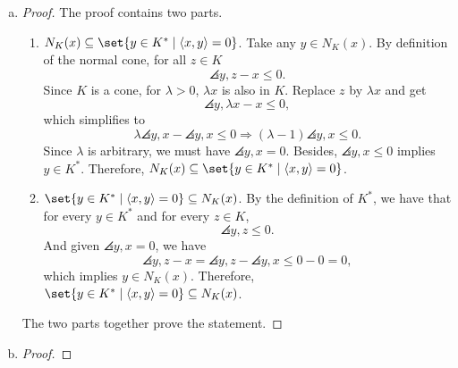 \documentclass{article}
\begin{document}
\begin{solution}
\begin{enumerate}[(a)]
{\begin{proof}
                Let $y$ be any feasible directions in $F_K(x)$. By definition, for all small $t>0$, $x+ty\in K$. By the convexity of $K$, the line segment connecting $x$ and $x+ty$ must entirely lie in $K$. For a sufficiently small $t$, this implies that $y$ can be represented as \[y=\frac{1}{t}(x+ty)-\frac{1}{t}x\Rightarrow(x+ty)-x=z-x,\] where $z=x+ty\in K$. We can set $\alpha=1$ to match the form required. So, $y=z-\alpha x$ with $x\in K$ and $\alpha=1\geq 0$.
            \end{proof}
        }
        \item {
            \begin{proof}
                The proof contains two parts.
                \begin{enumerate}
                    \item $N_K(x)\subseteq\set{y\in K^*\mid \angles{x,y}=0}$. Take any $y\in N_K(x)$. By definition of the normal cone, for all $z\in K$ \[\angles{y, z-x}\leq 0.\] Since $K$ is a cone, for $\lambda>0$, $\lambda x$ is also in $K$. Replace $z$  by $\lambda x$ and get \[\angles{y, \lambda x-x}\leq 0,\] which simplifies to \[\lambda\angles{y,x}-\angles{y,x}\leq 0 \Rightarrow (\lambda-1)\angles{y, x}\leq 0.\] Since $\lambda$ is arbitrary, we must have $\angles{y, x}=0$. Besides, $\angles{y,x}\leq 0$ implies $y\in K^*$. Therefore, $N_K(x)\subseteq\set{y\in K^*\mid \angles{x,y}=0}$.
                    \item $\set{y\in K^*\mid \angles{x,y}=0}\subseteq N_K(x)$. By the definition of $K^*$, we have that for every $y\in K^*$ and for every $z\in K$, \[\angles{y,z}\leq 0.\] And given $\angles{y, x}=0$, we have \[\angles{y, z-x}=\angles{y, z}-\angles{y, x}\leq 0-0 =0,\] which implies $y\in N_K(x)$. Therefore, $\set{y\in K^*\mid \angles{x,y}=0}\subseteq N_K(x)$.
                \end{enumerate}
                The two parts together prove the statement.
            \end{proof}
        }
        \item {
            \begin{proof}

\end{proof}}
\end{enumerate}
\end{solution}
\end{document}
